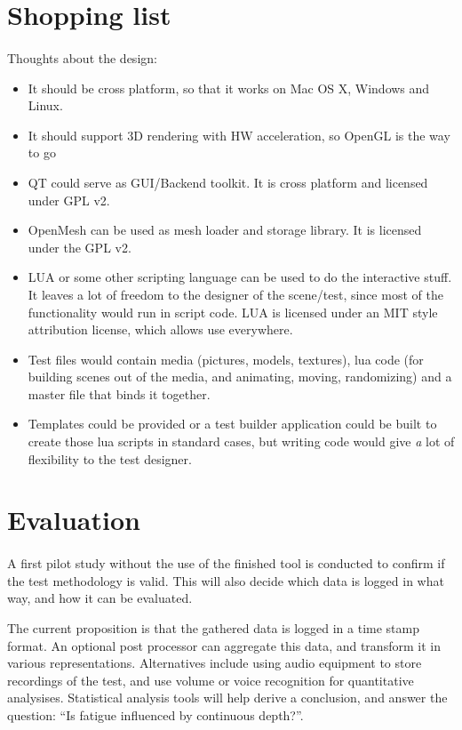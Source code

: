 \documentclass[11pt]{scrartcl}
\begin{document}
\begin{multicols}{2}
\section{Shopping list}
\paragraph{}
Thoughts about the design:

\begin{itemize}
\item It should be cross platform, so that it works on Mac OS X, Windows and Linux.
\item It should support 3D rendering with HW acceleration, so OpenGL is the way to go
\item QT could serve as GUI/Backend toolkit. It is cross platform and licensed under GPL v2.
\item OpenMesh can be used as mesh loader and storage library. It is licensed under the GPL v2.
\item LUA or some other scripting language can be used to do the interactive stuff. It leaves a lot of freedom to the designer of the scene/test, since most of the functionality would run in script code. LUA is licensed under an MIT style attribution license, which allows use everywhere.
\item Test files would contain media (pictures, models, textures), lua code (for building scenes out of the media, and animating, moving, randomizing) and a master file that binds it together.
\item Templates could be provided or a test builder application could be built to create those lua scripts in standard cases, but writing code would give {\textit a lot} of flexibility to the test designer.
\end{itemize}

\section{Evaluation}
\paragraph{}
A first pilot study without the use of the finished tool is conducted to confirm if the test methodology is valid. This will also decide which data is logged in what way, and how it can be evaluated.

The current proposition is that the gathered data is logged in a time stamp format. An optional post processor can aggregate this data, and transform it in various representations. Alternatives include using audio equipment to store recordings of the test, and use volume or voice recognition for quantitative analysises. Statistical analysis tools will help derive a conclusion, and answer the question: ``Is fatigue influenced by continuous depth?''.


\end{multicols}
\end{document}
